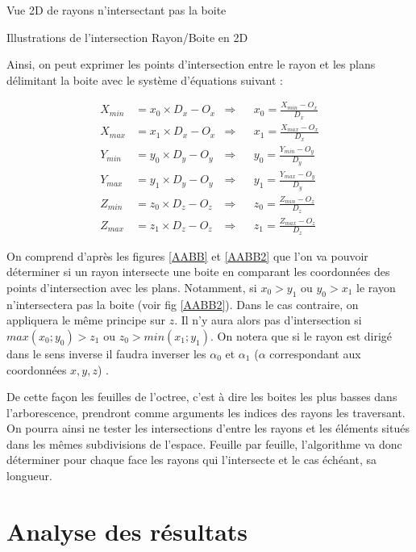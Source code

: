 \begin{figureth}
\begin{subfigureth}{0.45\textwidth}
		\caption{Vue 2D de rayons n'intersectant pas la boite}
		\label{AABB2}
	\end{subfigureth}
	\caption{Illustrations de l'intersection Rayon/Boite en 2D}
\end{figureth}

Ainsi, on peut exprimer les points d'intersection entre le rayon et les plans délimitant la boite avec le système d'équations suivant :

\begin{align}
X_{min} &= x_0 \times D_x - O_x 	& \Rightarrow 	& &	 x_0 = \frac{X_{min} - O_x}{D_x} \\
X_{max} &= x_1 \times D_x - O_x 	& \Rightarrow 	& &	x_1 = \frac{X_{max} - O_x}{D_x} \\
Y_{min} &= y_0 \times D_y - O_y 	& \Rightarrow	& &	y_0 = \frac{Y_{min} - O_y}{D_y} \\
Y_{max} &= y_1 \times D_y - O_y 	& \Rightarrow	& &	y_1 = \frac{Y_{max} - O_y}{D_y} \\
Z_{min} &= z_0 \times D_z - O_z	& \Rightarrow 	& &	z_0 = \frac{Z_{min} - O_z}{D_z} \\
Z_{max} &= z_1 \times D_z - O_z 	& \Rightarrow 	& &	z_1 = \frac{Z_{max} - O_z}{D_z} 
\end{align}

On comprend d'après les figures \ref{AABB} et \ref{AABB2} que l'on va pouvoir déterminer si un rayon intersecte une boite en comparant les coordonnées des points d'intersection avec les plans. Notamment, si $x_0 > y_1$ ou $y_0 > x_1$ le rayon n'intersectera pas la boite (voir fig \ref{AABB2}). Dans le cas contraire, on appliquera le même principe sur $z$. Il n'y aura alors pas d'intersection si $max(x_0 ; y_0) > z_1$ ou $ z_0 > min(x_1 ; y_1)$. On notera que si le rayon est dirigé dans le sens inverse il faudra inverser les $\alpha_0$ et $\alpha_1$ ($\alpha$ correspondant aux coordonnées $x,y,z$) .

De cette façon les feuilles de l'\gls{octree}, c'est à dire les boites les plus basses dans l'arborescence, prendront comme arguments les indices des rayons les traversant. On pourra ainsi ne tester les intersections d'entre les rayons et les éléments situés dans les mêmes subdivisions de l'espace. Feuille par feuille, l'algorithme va donc déterminer pour chaque face les rayons qui l'intersecte et le cas échéant, sa longueur.




\section{Analyse des résultats} \label{sect_resultatOctree}

